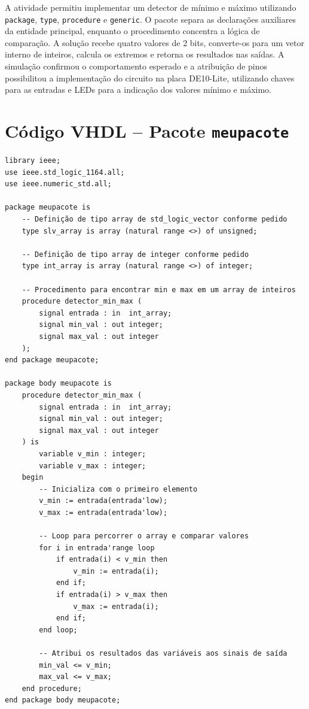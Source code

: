 \documentclass[12pt,a4paper, brazil]{article}
\begin{document}
A atividade permitiu implementar um detector de mínimo e máximo utilizando \texttt{package}, \texttt{type}, \texttt{procedure} e \texttt{generic}. O pacote separa as declarações auxiliares da entidade principal, enquanto o procedimento concentra a lógica de comparação. A solução recebe quatro valores de 2 bits, converte-os para um vetor interno de inteiros, calcula os extremos e retorna os resultados nas saídas. A simulação confirmou o comportamento esperado e a atribuição de pinos possibilitou a implementação do circuito na placa DE10-Lite, utilizando chaves para as entradas e LEDs para a indicação dos valores mínimo e máximo.

\appendix

\newpage
\section{Código VHDL -- Pacote \texttt{meupacote}}
\label{ap:codigo-pacote}

\begin{lstlisting}[style=vhdl, caption={Arquivo \texttt{meupacote.vhd}.}]
library ieee;
use ieee.std_logic_1164.all;
use ieee.numeric_std.all;

package meupacote is
    -- Definição de tipo array de std_logic_vector conforme pedido
    type slv_array is array (natural range <>) of unsigned;
    
    -- Definição de tipo array de integer conforme pedido
    type int_array is array (natural range <>) of integer;

    -- Procedimento para encontrar min e max em um array de inteiros
    procedure detector_min_max (
        signal entrada : in  int_array;
        signal min_val : out integer;
        signal max_val : out integer
    );
end package meupacote;

package body meupacote is
    procedure detector_min_max (
        signal entrada : in  int_array;
        signal min_val : out integer;
        signal max_val : out integer
    ) is
        variable v_min : integer;
        variable v_max : integer;
    begin
        -- Inicializa com o primeiro elemento
        v_min := entrada(entrada'low);
        v_max := entrada(entrada'low);
        
        -- Loop para percorrer o array e comparar valores
        for i in entrada'range loop
            if entrada(i) < v_min then
                v_min := entrada(i);
            end if;
            if entrada(i) > v_max then
                v_max := entrada(i);
            end if;
        end loop;
        
        -- Atribui os resultados das variáveis aos sinais de saída
        min_val <= v_min;
        max_val <= v_max;
    end procedure;
end package body meupacote;
\end{lstlisting}
\end{document}
